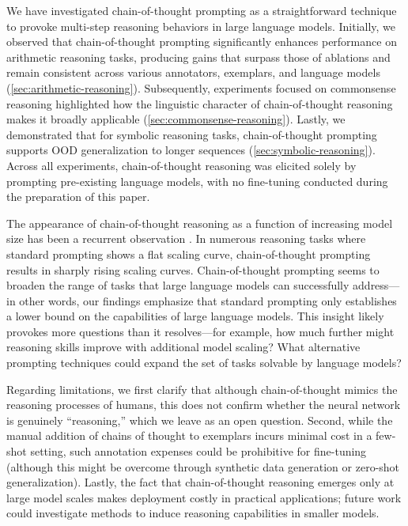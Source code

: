 We have investigated chain-of-thought prompting as a straightforward technique to provoke multi-step reasoning behaviors in large language models. Initially, we observed that chain-of-thought prompting significantly enhances performance on arithmetic reasoning tasks, producing gains that surpass those of ablations and remain consistent across various annotators, exemplars, and language models (\cref{sec:arithmetic-reasoning}). Subsequently, experiments focused on commonsense reasoning highlighted how the linguistic character of chain-of-thought reasoning makes it broadly applicable (\cref{sec:commonsense-reasoning}). Lastly, we demonstrated that for symbolic reasoning tasks, chain-of-thought prompting supports OOD generalization to longer sequences (\cref{sec:symbolic-reasoning}). Across all experiments, chain-of-thought reasoning was elicited solely by prompting pre-existing language models, with no fine-tuning conducted during the preparation of this paper.

The appearance of chain-of-thought reasoning as a function of increasing model size has been a recurrent observation \citep{wei2022emergent}. In numerous reasoning tasks where standard prompting shows a flat scaling curve, chain-of-thought prompting results in sharply rising scaling curves. Chain-of-thought prompting seems to broaden the range of tasks that large language models can successfully address—in other words, our findings emphasize that standard prompting only establishes a lower bound on the capabilities of large language models. This insight likely provokes more questions than it resolves—for example, how much further might reasoning skills improve with additional model scaling? What alternative prompting techniques could expand the set of tasks solvable by language models?

Regarding limitations, we first clarify that although chain-of-thought mimics the reasoning processes of humans, this does not confirm whether the neural network is genuinely “reasoning,” which we leave as an open question. Second, while the manual addition of chains of thought to exemplars incurs minimal cost in a few-shot setting, such annotation expenses could be prohibitive for fine-tuning (although this might be overcome through synthetic data generation or zero-shot generalization).  Lastly, the fact that chain-of-thought reasoning emerges only at large model scales makes deployment costly in practical applications; future work could investigate methods to induce reasoning capabilities in smaller models.

